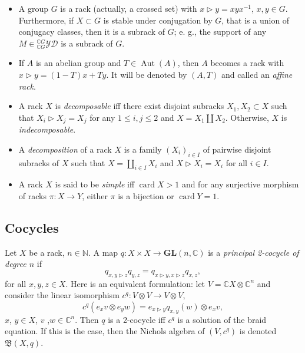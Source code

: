 \documentclass[11pt]{amsart} \textheight 22cm
\renewcommand{\^}[1]{\mbox{$^{\left( #1 \right)}$}}
\renewcommand{\_}[1]{\mbox{$_{\left( #1 \right)}$}}
\newcommand\toba{{\mathfrak B }}
\newcommand{\trid}{\triangleright}
\newcommand{\ku}{\mathbb C}
\newcommand{\N}{{\mathbb N}}
\newcommand{\GL}{\mathbf{GL}}
\newcommand{\ydg}{{}^{\ku G}_{\ku G}\mathcal{YD}}
\newcommand{\Aut}{\operatorname{Aut}}
\newcommand\card{\operatorname{card}}
\theoremstyle{plain}
\theoremstyle{definition}
\theoremstyle{remark}
\theoremstyle{remark}
\begin{document}
\begin{itemize}
    \item A group $G$ is a rack (actually, a crossed set) with $x\trid y = xyx^{-1}$, $x,y\in G$. Furthermore, if
        $X\subset G$ is stable under conjugation by $G$, that is a union of conjugacy
        classes, then it is a subrack of $G$; e. g., the support of any $M\in \ydg$ is a
        subrack of $G$.

    \smallbreak\item If $A$ is an abelian group and $T\in\Aut(A)$, then $A$ becomes a rack with $x\trid
        y=(1-T)x+Ty$. It will be denoted by $(A,T)$ and called an \emph{affine
        rack}.\label{page:affinerack}

    \smallbreak\item A rack $X$ is \emph{decomposable} iff there exist disjoint subracks
        $X_1,X_2\subset X$ such that $X_i\trid X_j=X_j$ for any $1\le i,j\le 2$ and
        $X=X_1\coprod X_2 $. Otherwise,  $X$ is \emph{indecomposable}.

    \smallbreak    \item A \emph{decomposition} of a rack $X$ is a family $(X_i)_{i\in I}$ of
        pairwise disjoint subracks of $X$ such that $X = \coprod_{i\in I} X_i$ and
        $X\trid X_i = X_i$ for all $i\in I$.

    \smallbreak    \item A rack $X$ is said to be \emph{simple} iff $\card X>1$ and for any surjective
        morphism of racks $\pi: X \to Y$, either $\pi$ is a bijection or $\card Y = 1$.
\end{itemize}



\medbreak\subsection{Cocycles}\label{subsect:rack-cocycles}

Let $X$ be a rack, $n\in \N$. A map $q:X\times X\to\GL(n,\ku)$ is
a \emph{principal 2-cocycle of degree $n$} if
$$q_{x,y\trid z}q_{y,z}= q_{x\trid y,x\trid z}q_{x,z},$$
for all $x,y,z\in X$. Here is an equivalent formulation: let $V=
\ku X\otimes\ku^{n}$ and consider the linear isomorphism
$c^q:V\otimes V\to V\otimes V$,
$$c^q(e_xv\otimes e_yw) = e_{x\trid y}q_{x,y}(w)\otimes e_xv,$$
$x$, $y\in X$, $v$ ,$w\in\ku^{n}$. Then $q$ is a 2-cocycle iff
$c^q$ is a solution of the braid equation. If this is the case,
then the Nichols algebra of $(V, c^q)$ is denoted $\toba(X, q)$.
\end{document}
